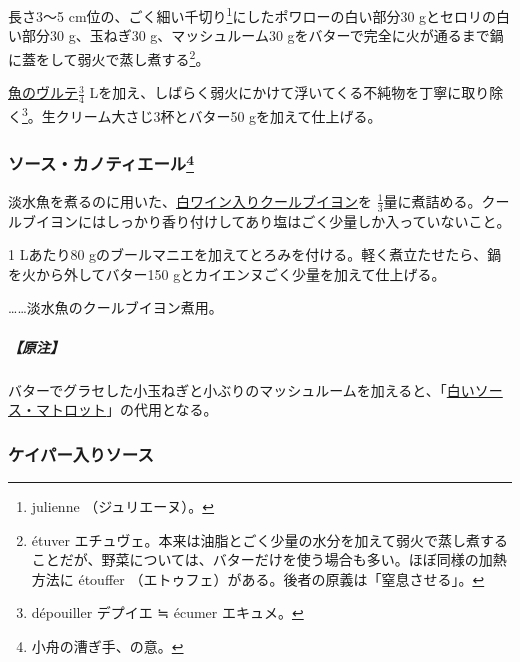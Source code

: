 \begin{recette}
長さ3〜5 cm位の、ごく細い千切り\footnote{julienne （ジュリエーヌ）。}にしたポワローの白い部分30
gとセロリの白い部分30 g、玉ねぎ30 g、マッシュルーム30
gをバターで完全に火が通るまで鍋に蓋をして弱火で蒸し煮する\footnote{étuver
  エチュヴェ。本来は油脂とごく少量の水分を加えて弱火で蒸し煮することだが、野菜については、バターだけを使う場合も多い。ほぼ同様の加熱方法に
  étouffer （エトゥフェ）がある。後者の原義は「窒息させる」。}。

\protect\hyperlink{veloute-de-poisson}{魚のヴルテ}\(\frac{3}{4}\)
Lを加え、しばらく弱火にかけて浮いてくる不純物を丁寧に取り除く\footnote{dépouiller
  デプイエ ≒ écumer エキュメ。}。生クリーム大さじ3杯とバター50
gを加えて仕上げる。

\atoaki{}

\hypertarget{sauce-canotiere}{%
\subsubsection[ソース・カノティエール]{\texorpdfstring{ソース・カノティエール\footnote{小舟の漕ぎ手、の意。}}{ソース・カノティエール}}\label{sauce-canotiere}}



淡水魚を煮るのに用いた、\protect\hyperlink{court-bouillon-b}{白ワイン入りクールブイヨン}を
\(\frac{1}{3}\)量に煮詰める。クールブイヨンにはしっかり香り付けしてあり塩はごく少量しか入っていないこと。

1 Lあたり80
gのブールマニエを加えてとろみを付ける。軽く煮立たせたら、鍋を火から外してバター150
gとカイエンヌごく少量を加えて仕上げる。

\ldots{}\ldots{}淡水魚のクールブイヨン煮用。

\hypertarget{nota-sauce-canotiere}{%
\subparagraph{【原注】}\label{nota-sauce-canotiere}}

バターでグラセした小玉ねぎと小ぶりのマッシュルームを加えると、「\protect\hyperlink{sauce-matelote-blanche}{白いソース・マトロット}」の代用となる。

\atoaki{}

\hypertarget{sauce-aux-capres}{%
\subsubsection{ケイパー入りソース}\label{sauce-aux-capres}}


\end{recette}
